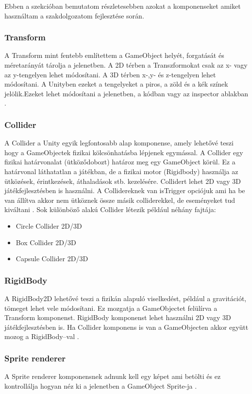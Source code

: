 \documentclass[
]{thesis-ekf}
\theoremstyle{definition}
\theoremstyle{remark}
\begin{document}
Ebben a szekcióban bemutatom részletesebben azokat a komponenseket amiket használtam a szakdolgozatom fejlesztése során.

\subsubsection{Transform}
A Transform  mint fentebb említettem a GameObject helyét, forgatását és méretarányát tárolja a jelenetben. A 2D térben a Transzformokat csak az x- vagy az y-tengelyen lehet módosítani. A 3D térben x-,y- és z-tengelyen lehet módosítani.  A Unityben ezeket a tengelyeket a piros, a zöld és a kék színek jelölik.Ezeket lehet módosítani a jelenetben, a kódban vagy az inspector ablakban \cite{UnityTransform}.
\subsubsection{Collider}
A Collider a Unity egyik legfontosabb alap komponense, amely lehetővé teszi hogy a GameObjectek fizikai kölcsönhatásba lépjenek egymással. A Collider egy fizikai határvonalat (ütköződobozt) határoz meg egy GameObject körül. Ez a határvonal láthatatlan a játékban, de a fizikai motor (Rigidbody) használja az ütközések, érintkezések, áthaladások stb. kezelésére. Collidert lehet 2D vagy 3D játékfejlesztésben is használni. A Collidereknek van isTrigger opciójuk ami ha be van állítva akkor nem ütköznek össze másik colliderekkel, de eseményeket tud kiváltani \cite{UnityCollider}. Sok különböző alakú Collider létezik például néhány fajtája:
\begin{itemize}
	\item Circle Collider 2D/3D
	\item Box Collider 2D/3D
	\item Capsule Collider 2D/3D
\end{itemize}

\subsubsection{RigidBody}
A RigidBody2D lehetővé teszi a fizikán alapuló viselkedést, például a gravitációt, tömeget lehet vele módosítani. Ez mozgatja a GameObjectet felülírva a Transform komponenst. RigidBody komponenst lehet használni 2D vagy 3D játékfejlesztésben is. Ha Collider komponens is van a GameObjecten akkor együtt mozog a RigidBody--val \cite{UnityRigidBody}.

\subsubsection{Sprite renderer}
A Sprite renderer komponensnek adnunk kell egy képet ami betölti és ez kontrollálja hogyan néz ki a jelenetben a GameObject Sprite-ja \cite{UnitySpriteRenderer}.
\end{document}
